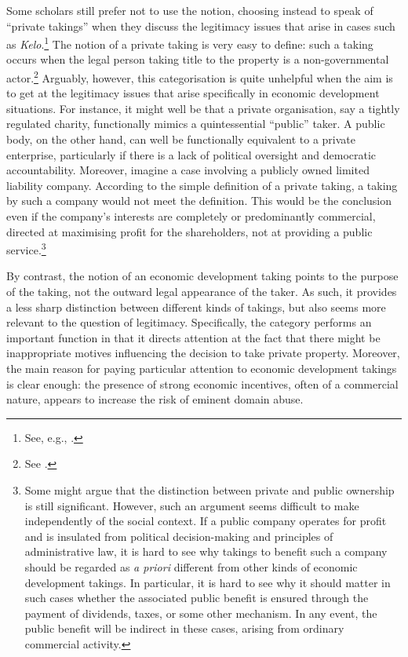 Some scholars still prefer not to use the notion, choosing instead to speak of ``private takings'' when they discuss the legitimacy issues that arise in cases such as {\it Kelo}.\footnote{See, e.g., \cite{bell09}.} The notion of a private taking is very easy to define: such a taking occurs when the legal person taking title to the property is a non-governmental actor.\footnote{See \cite[519]{bell09}.} Arguably, however, this categorisation is quite unhelpful when the aim is to get at the legitimacy issues that arise specifically in economic development situations. For instance, it might well be that a private organisation, say a tightly regulated charity, functionally mimics a quintessential ``public'' taker. A public body, on the other hand, can well be functionally equivalent to a private enterprise, particularly if there is a lack of political oversight and democratic accountability. Moreover, imagine a case involving a publicly owned limited liability company. According to the simple definition of a private taking, a taking by such a company would not meet the definition. This would be the conclusion even if the company's interests are completely or predominantly commercial, directed at maximising profit for the shareholders, not at providing a public service.\footnote{Some might argue that the distinction between private and public ownership is still significant. However, such an argument seems difficult to make independently of the social context. If a public company operates for profit and is insulated from political decision-making and principles of administrative law, it is hard to see why takings to benefit such a company should be regarded as {\it a priori} different from other kinds of economic development takings. In particular, it is hard to see why it should matter in such cases whether the associated public benefit is ensured through the payment of dividends, taxes, or some other mechanism. In any event, the public benefit will be indirect in these cases, arising from ordinary commercial activity.}

By contrast, the notion of an economic development taking points to the purpose of the taking, not the outward legal appearance of the taker. As such, it provides a less sharp distinction between different kinds of takings, but also seems more relevant to the question of legitimacy. Specifically, the category performs an important function in that it directs attention at the fact that there might be  inappropriate motives influencing the decision to take private property. Moreover, the main reason for paying particular attention to economic development takings is clear enough: the presence of strong economic incentives, often of a commercial nature, appears to increase the risk of eminent domain abuse.

